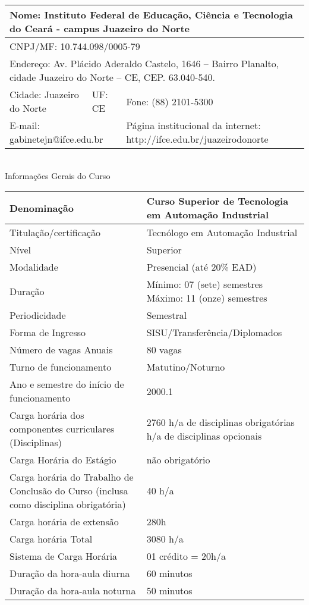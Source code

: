\begin{tabular}{|p{5cm}|p{1.5cm}|p{7cm}|}
\hline 
\multicolumn{3}{|p{14cm}|}{Nome: Instituto Federal de Educação, Ciência e Tecnologia do Ceará - campus Juazeiro do Norte} \\ 
\hline 
\multicolumn{3}{|p{14cm}|}{CNPJ/MF: 10.744.098/0005-79} \\ 
\hline 
\multicolumn{3}{|p{14cm}|}{Endereço: Av. Plácido Aderaldo Castelo, 1646 – Bairro Planalto, cidade
Juazeiro do Norte – CE, CEP. 63.040-540.} \\ 
\hline 
Cidade: Juazeiro do Norte & UF:
CE & Fone: (88) 2101-5300 \\ 
\hline 
\multicolumn{2}{|p{7cm}|}{E-mail: gabinetejn@ifce.edu.br} & Página institucional da internet:
http://ifce.edu.br/juazeirodonorte \\ 
\hline 
\end{tabular} \\

\vspace{1cm}
Informações Gerais do Curso

\begin{tabular}{|p{7cm}|p{7cm}|}
\hline 
Denominação & Curso Superior de
Tecnologia em Automação
Industrial \\ 
\hline 
Titulação/certificação & Tecnólogo em Automação
Industrial \\ 
\hline 
Nível & Superior \\ 
\hline 
Modalidade & Presencial (até 20\% EAD) \\ 
\hline 
Duração & Mínimo: 07 (sete) semestres \newline
Máximo: 11 (onze) semestres \\ 
\hline 
Periodicidade & Semestral \\ 
\hline 
Forma de Ingresso & SISU/Transferência/Diplomados \\ 
\hline 
Número de vagas Anuais & 80 vagas \\ 
\hline 
Turno de funcionamento & Matutino/Noturno \\ 
\hline 
Ano e semestre do início de funcionamento & 2000.1 \\ 
\hline 
Carga horária dos
componentes curriculares
(Disciplinas) & 2760 h/a de
disciplinas
obrigatórias 
\newline
40 h/a de disciplinas opcionais \\ 
\hline 
Carga Horária do Estágio & não obrigatório \\ 
\hline 
Carga horária do Trabalho de Conclusão do Curso (inclusa como disciplina obrigatória)& 40 h/a \\ 
\hline
Carga horária de extensão& 280h\\
\hline 
Carga horária Total & 3080 h/a \\ 
\hline 
Sistema de Carga Horária & 01 crédito = 20h/a \\ 
\hline 
Duração da hora-aula diurna & 60 minutos \\ 
\hline 
Duração da hora-aula noturna & 50 minutos \\
\hline 
\end{tabular}

